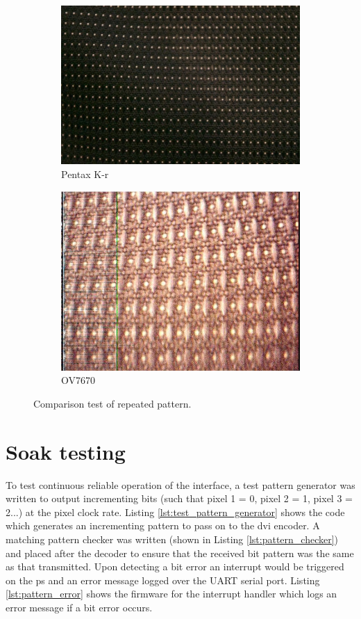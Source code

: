 \begin{figure}
\centering
\begin{subfigure}{.5\textwidth}
  \centering
  \includegraphics[width=.4\linewidth]{./img/pentax_texture.jpg}
  \caption{Pentax K-r}
\end{subfigure}%
\begin{subfigure}{.5\textwidth}
  \centering
  \includegraphics[width=.4\linewidth]{./img/ov7670_texture.jpg}
  \caption{OV7670}
\end{subfigure}
\label{fig:texture_capture}
\caption{Comparison test of repeated pattern.}
\end{figure}

\section{Soak testing}
To test continuous reliable operation of the interface, a test pattern generator was written to output incrementing bits (such that pixel 1 = 0, pixel 2 = 1, pixel 3 = 2...) at the pixel clock rate. Listing \ref{lst:test_pattern_generator} shows the code which generates an incrementing pattern to pass on to the \gls{dvi} encoder. A matching pattern checker was written (shown in Listing \ref{lst:pattern_checker}) and placed after the decoder to ensure that the received bit pattern was the same as that transmitted. Upon detecting a bit error an interrupt would be triggered on the \gls{ps} and an error message logged over the UART serial port. Listing \ref{lst:pattern_error} shows the firmware for the interrupt handler which logs an error message if a bit error occurs.


